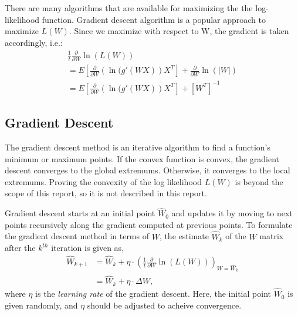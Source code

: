 \documentclass[conference]{IEEEtran}
\begin{document}
There are many algorithms that are available for maximizing the the log-likelihood function. Gradient descent algorithm is a popular approach to maximize $L(W)$. Since we maximize with respect to W, the gradient is taken accordingly, i.e.:
\begin{equation}
\label{eq:grad}
\begin{aligned}
    \frac{1}{t}\frac{\partial}{\partial W}\ln(L(W)) \\
    = E\left[\frac{\partial}{\partial W}(\ln{(g'(WX)})X^T\right] + \frac{\partial}{\partial W}\ln{(|W|)} \\
    = E\left[\frac{\partial}{\partial W}(\ln{(g'(WX)})X^T\right] + \left[W^T\right]^{-1}
\end{aligned}
\end{equation}


\subsection{Gradient Descent}
The gradient descent method is an iterative algorithm to find a function's minimum or maximum points. If the convex function is convex, the gradient descent converges to the global extremums. Otherwise, it converges to the local extremums. Proving the convexity of the log likelihood $L(W)$ is beyond the scope of this report, so it is not described in this report.

Gradient descent starts at an initial point $\hat{W}_0$ and updates it by moving to next points recursively along the gradient computed at previous points. To formulate the gradient descent method in terms of $W$, the estimate $\hat{W}_{k}$ of the $W$ matrix after the $k^{th}$ iteration is given as, 
\begin{equation}
\begin{aligned}
    \hat{W}_{k+1} &= \hat{W}_k + \eta\cdot\left(\frac{1}{t}\frac{\partial}{\partial W}\ln(L(W))\right)_{W=\hat{W}_k}\\
     &= \hat{W}_k + \eta\cdot\Delta W,
\end{aligned}
\end{equation}
where $\eta$ is the {\it learning rate} of the gradient descent.
Here, the initial point $\hat{W}_0$ is given randomly, and $\eta$ should be adjusted to acheive convergence.
\end{document}
